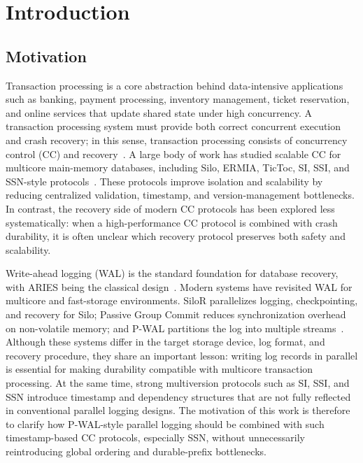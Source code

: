 \section{Introduction}
\label{sec:introduction}

\subsection{Motivation}
\label{sec:introduction-motivation}

Transaction processing is a core abstraction behind data-intensive applications
such as banking, payment processing, inventory management, ticket reservation,
and online services that update shared state under high concurrency.  A
transaction processing system must provide both correct concurrent execution and
crash recovery; in this sense, transaction processing consists of concurrency
control (CC) and recovery~\cite{bernstein1987ccr}.  A large body of work has
studied scalable CC for multicore main-memory databases, including Silo, ERMIA,
TicToc, SI, SSI, and SSN-style protocols~\cite{tu2013silo,kim2016ermia,yu2016tictoc,ports2012ssi,wang2017ssn,tanabe2020ccbench}.
These protocols improve isolation and scalability by reducing centralized
validation, timestamp, and version-management bottlenecks.  In contrast, the
recovery side of modern CC protocols has been explored less systematically:
when a high-performance CC protocol is combined with crash durability, it is
often unclear which recovery protocol preserves both safety and scalability.

Write-ahead logging (WAL) is the standard foundation for database recovery, with
ARIES being the classical design~\cite{haerder1983principles,mohan1992aries}.
Modern systems have revisited WAL for multicore and fast-storage environments.
SiloR parallelizes logging, checkpointing, and recovery for Silo; Passive Group
Commit reduces synchronization overhead on non-volatile memory; and P-WAL
partitions the log into multiple streams~\cite{zheng2014silor,wang2014nvm,kamiya2017pwal}.
Although these systems differ in the target storage device, log format, and
recovery procedure, they share an important lesson: writing log records in
parallel is essential for making durability compatible with multicore
transaction processing.  At the same time, strong multiversion protocols such
as SI, SSI, and SSN introduce timestamp and dependency structures that are not
fully reflected in conventional parallel logging designs.  The motivation of
this work is therefore to clarify how P-WAL-style parallel logging should be
combined with such timestamp-based CC protocols, especially SSN, without
unnecessarily reintroducing global ordering and durable-prefix bottlenecks.


